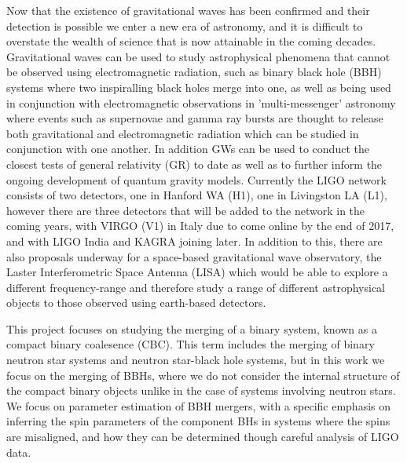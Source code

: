 \documentclass[]{article}
\begin{document}
Now that the existence of gravitational waves has been confirmed and their detection is possible we enter a new era of astronomy, and it is difficult to overstate the wealth of science that is now attainable in the coming decades. Gravitational waves can be used to study astrophysical phenomena that cannot be observed using electromagnetic radiation, such as binary black hole (BBH) systems where two inspiralling black holes merge into one, as well as being used in conjunction with electromagnetic observations in 'multi-messenger' astronomy where events such as supernovae and gamma ray bursts are thought to release both gravitational and electromagnetic radiation which can be studied in conjunction with one another\cite{mm}\cite{mm2}. In addition GWs can be used to conduct the closest tests of general relativity (GR) to date\cite{gr1}\cite{gr2} as well as to further inform the ongoing development of quantum gravity models\cite{qgrav}. Currently the LIGO network consists of two detectors, one in Hanford WA (H1), one in Livingston LA (L1), however there are three detectors that will be added to the network in the coming years, with VIRGO (V1) in Italy due to come online by the end of 2017, and with LIGO India and KAGRA joining later. In addition to this, there are also proposals underway for a space-based gravitational wave observatory, the Laster Interferometric Space Antenna (LISA)\cite{lisa} which would be able to explore a different frequency-range and therefore study a range of different astrophysical objects to those observed using earth-based detectors.

This project focuses on studying the merging of a binary system, known as a compact binary coalesence (CBC). This term includes the merging of binary neutron star systems and neutron star-black hole systems, but in this work we focus on the merging of BBHs, where we do not consider the internal structure of the compact binary objects unlike in the case of systems involving neutron stars. We focus on parameter estimation of BBH mergers, with a specific emphasis on inferring the spin parameters of the component BHs in systems where the spins are misaligned, and how they can be determined though careful analysis of LIGO data.
\end{document}
